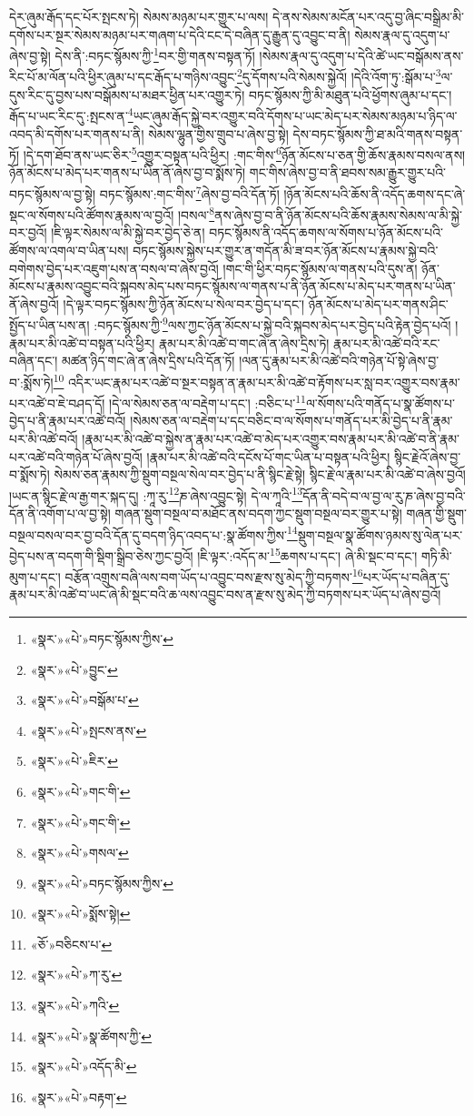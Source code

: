 དེར་ཞུམ་རྒོད་དང་པོར་སྤངས་ཏེ། སེམས་མཉམ་པར་གྱུར་པ་ལས། དེ་ནས་སེམས་མངོན་པར་འདུ་བྱ་ཞིང་བསྒྲིམ་མི་དགོས་པར་སྔར་སེམས་མཉམ་པར་གཞག་པ་དེའི་ངང་དེ་བཞིན་དུ་རྒྱུན་དུ་འབྱུང་བ་ནི། སེམས་རྣལ་དུ་འདུག་པ་ཞེས་བྱ་སྟེ། དེས་ནི་:བཏང་སྙོམས་ཀྱི་\footnote{«སྣར་»«པེ་»བཏང་སྙོམས་ཀྱིས་}བར་གྱི་གནས་བསྟན་ཏོ། །སེམས་རྣལ་དུ་འདུག་པ་དེའི་ཚེ་ཡང་བསྒོམས་ནས་རིང་པོ་མ་ལོན་པའི་ཕྱིར་ཞུམ་པ་དང་རྒོད་པ་གཉིས་འབྱུང་\footnote{«སྣར་»«པེ་»བྱུང་}དུ་དོགས་པའི་སེམས་སྐྱེའོ། །དེའི་འོག་ཏུ་:སྒོམ་པ་\footnote{«སྣར་»«པེ་»བསྒོམ་པ་}ལ་དུས་རིང་དུ་བྱས་པས་བསྒོམས་པ་མཐར་ཕྱིན་པར་འགྱུར་ཏེ། བཏང་སྙོམས་ཀྱི་མི་མཐུན་པའི་ཕྱོགས་ཞུམ་པ་དང་། རྒོད་པ་ཡང་རིང་དུ་:སྤངས་ན་\footnote{«སྣར་»«པེ་»སྤངས་ནས་}ཡང་ཞུམ་རྒོད་སྐྱེ་བར་འགྱུར་བའི་དོགས་པ་ཡང་མེད་པར་སེམས་མཉམ་པ་ཉིད་ལ་འབད་མི་དགོས་པར་གནས་པ་ནི། སེམས་ལྷུན་གྱིས་གྲུབ་པ་ཞེས་བྱ་སྟེ། དེས་བཏང་སྙོམས་ཀྱི་ཐ་མའི་གནས་བསྟན་ཏོ། །དེ་དག་ཐོབ་ནས་ཡང་ཅིར་\footnote{«སྣར་»«པེ་»ཇིར་}འགྱུར་བསྟན་པའི་ཕྱིར། :གང་གིས་\footnote{«སྣར་»«པེ་»གང་གི་}ཉོན་མོངས་པ་ཅན་གྱི་ཆོས་རྣམས་བསལ་ནས། ཉོན་མོངས་པ་མེད་པར་གནས་པ་ཡིན་ནོ་ཞེས་བྱ་བ་སྨོས་ཏེ། གང་གིས་ཞེས་བྱ་བ་ནི་ཐབས་སམ་རྒྱུར་གྱུར་པའི་བཏང་སྙོམས་ལ་བྱ་སྟེ། བཏང་སྙོམས་:གང་གིས་\footnote{«སྣར་»«པེ་»གང་གི་}ཞེས་བྱ་བའི་དོན་ཏོ། །ཉོན་མོངས་པའི་ཆོས་ནི་འདོད་ཆགས་དང་ཞེ་སྡང་ལ་སོགས་པའི་ཚོགས་རྣམས་ལ་བྱའོ། །བསལ་\footnote{«སྣར་»«པེ་»གསལ་}ནས་ཞེས་བྱ་བ་ནི་ཉོན་མོངས་པའི་ཆོས་རྣམས་སེམས་ལ་མི་སྐྱེ་བར་བྱའོ། །ཇི་ལྟར་སེམས་ལ་མི་སྐྱེ་བར་བྱེད་ཅེ་ན། བཏང་སྙོམས་ནི་འདོད་ཆགས་ལ་སོགས་པ་ཉོན་མོངས་པའི་ཚོགས་ལ་འགལ་བ་ཡིན་པས། བཏང་སྙོམས་སྐྱེས་པར་གྱུར་ན་གདོན་མི་ཟ་བར་ཉོན་མོངས་པ་རྣམས་སྐྱེ་བའི་བགེགས་བྱེད་པར་འཇུག་པས་ན་བསལ་བ་ཞེས་བྱའོ། །གང་གི་ཕྱིར་བཏང་སྙོམས་ལ་གནས་པའི་དུས་ན། ཉོན་མོངས་པ་རྣམས་འབྱུང་བའི་སྐབས་མེད་པས་བཏང་སྙོམས་ལ་གནས་པ་ནི་ཉོན་མོངས་པ་མེད་པར་གནས་པ་ཡིན་ནོ་ཞེས་བྱའོ། །དེ་ལྟར་བཏང་སྙོམས་ཀྱི་ཉོན་མོངས་པ་སེལ་བར་བྱེད་པ་དང་། ཉོན་མོངས་པ་མེད་པར་གནས་ཤིང་སྤྱོད་པ་ཡིན་པས་ན། :བཏང་སྙོམས་ཀྱི་\footnote{«སྣར་»«པེ་»བཏང་སྙོམས་ཀྱིས་}ལས་ཀྱང་ཉོན་མོངས་པ་སྐྱེ་བའི་སྐབས་མེད་པར་བྱེད་པའི་རྟེན་བྱེད་པའོ། །རྣམ་པར་མི་འཚེ་བ་བསྟན་པའི་ཕྱིར། རྣམ་པར་མི་འཚེ་བ་གང་ཞེ་ན་ཞེས་དྲིས་ཏེ། རྣམ་པར་མི་འཚེ་བའི་རང་བཞིན་དང་། མཚན་ཉིད་གང་ཞེ་ན་ཞེས་དྲིས་པའི་དོན་ཏོ། །ལན་དུ་རྣམ་པར་མི་འཚེ་བའི་གཉེན་པོ་སྟེ་ཞེས་བྱ་བ་:སྨོས་ཏེ།\footnote{«སྣར་»«པེ་»སྨོས་སྟེ།} འདིར་ཡང་རྣམ་པར་འཚེ་བ་སྔར་བསྟན་ན་རྣམ་པར་མི་འཚེ་བ་རྟོགས་པར་སླ་བར་འགྱུར་བས་རྣམ་པར་འཚེ་བ་ཇེ་བཤད་དོ། །དེ་ལ་སེམས་ཅན་ལ་བརྡེག་པ་དང་། :བཅིང་པ་\footnote{«ཅོ་»བཅིངས་པ་}ལ་སོགས་པའི་གནོད་པ་སྣ་ཚོགས་པ་བྱེད་པ་ནི་རྣམ་པར་འཚེ་བའོ། །སེམས་ཅན་ལ་བརྡེག་པ་དང་བཅིང་བ་ལ་སོགས་པ་གནོད་པར་མི་བྱེད་པ་ནི་རྣམ་པར་མི་འཚེ་བའོ། །རྣམ་པར་མི་འཚེ་བ་སྐྱེས་ན་རྣམ་པར་འཚེ་བ་མེད་པར་འགྱུར་བས་རྣམ་པར་མི་འཚེ་བ་ནི་རྣམ་པར་འཚེ་བའི་གཉེན་པོ་ཞེས་བྱའོ། །རྣམ་པར་མི་འཚེ་བའི་དངོས་པོ་གང་ཡིན་པ་བསྟན་པའི་ཕྱིར། སྙིང་རྗེའོ་ཞེས་བྱ་བ་སྨོས་ཏེ། སེམས་ཅན་རྣམས་ཀྱི་སྡུག་བསྔལ་སེལ་བར་བྱེད་པ་ནི་སྙིང་རྗེ་སྟེ། སྙིང་རྗེ་ལ་རྣམ་པར་མི་འཚེ་བ་ཞེས་བྱའོ། །ཡང་ན་སྙིང་རྗེ་ལ་རྒྱ་གར་སྐད་དུ། :ཀཱ་རུ་\footnote{«སྣར་»«པེ་»ཀ་རུ་}ཎ་ཞེས་འབྱུང་སྟེ། དེ་ལ་ཀཱའི་\footnote{«སྣར་»«པེ་»ཀའི་}དོན་ནི་བདེ་བ་ལ་བྱ་ལ་རུ་ཎ་ཞེས་བྱ་བའི་དོན་ནི་འགོག་པ་ལ་བྱ་སྟེ། གཞན་སྡུག་བསྔལ་བ་མཐོང་ནས་བདག་ཀྱང་སྡུག་བསྔལ་བར་གྱུར་པ་སྟེ། གཞན་གྱི་སྡུག་བསྔལ་བསལ་བར་བྱ་བའི་དོན་དུ་བདག་ཉིད་འབད་པ་:སྣ་ཚོགས་ཀྱིས་\footnote{«སྣར་»«པེ་»སྣ་ཚོགས་ཀྱི་}སྡུག་བསྔལ་སྣ་ཚོགས་ཉམས་སུ་ལེན་པར་བྱེད་པས་ན་བདག་གི་སྡིག་སྒྲིབ་ཅེས་ཀྱང་བྱའོ། །ཇི་ལྟར་:འདོད་མ་\footnote{«སྣར་»«པེ་»འདོད་མི་}ཆགས་པ་དང་། ཞེ་མི་སྡང་བ་དང་། གཏི་མི་མུག་པ་དང་། བརྩོན་འགྲུས་བཞི་ལས་བག་ཡོད་པ་འབྱུང་བས་རྫས་སུ་མེད་ཀྱི་བཏགས་\footnote{«སྣར་»«པེ་»བརྟག་}པར་ཡོད་པ་བཞིན་དུ་རྣམ་པར་མི་འཚེ་བ་ཡང་ཞེ་མི་སྡང་བའི་ཆ་ལས་འབྱུང་བས་ན་རྫས་སུ་མེད་ཀྱི་བཏགས་པར་ཡོད་པ་ཞེས་བྱའོ། 